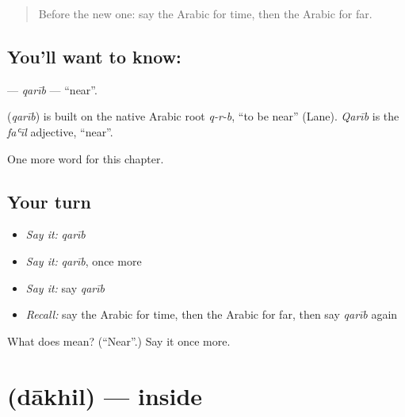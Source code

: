 \label{lesson:AR-C88-qarib}



\begin{quote}
Before the new one: say the Arabic for time, then the Arabic for far.
\end{quote}

\subsection*{You'll want to know: }
\textbf{} — \emph{qarīb} — \textquotedblleft{}near\textquotedblright{}.

\begin{cousinweb}
\textbf{} (\emph{qarīb}) is built on the native Arabic root \emph{q-r-b}, \textquotedblleft{}to be near\textquotedblright{} (Lane). \emph{Qarīb} is the \emph{faʿīl} adjective, \textquotedblleft{}near\textquotedblright{}.
\end{cousinweb}

\begin{grammarlens}[title={What you've built}]
One more word for this chapter.
\end{grammarlens}

\subsection*{Your turn}
\begin{itemize}
\raggedright
  \item \emph{Say it:} \emph{qarīb}
  \item \emph{Say it:} \emph{qarīb}, once more
  \item \emph{Say it:} say \emph{qarīb}
  \item \emph{Recall:} say the Arabic for time, then the Arabic for far, then say \emph{qarīb} again
\end{itemize}

\begin{tcolorbox}[breakable,colback=teal!4,colframe=teal!35!black,title={Before you move on}]
What does  mean? (\textquotedblleft{}Near\textquotedblright{}.) Say it once more.
\end{tcolorbox}
\section[\texorpdfstring{\ar{داخل} (dākhil)}{داخل (dākhil)}]{ (dākhil) — inside}

\label{lesson:AR-C88-dakhil}



